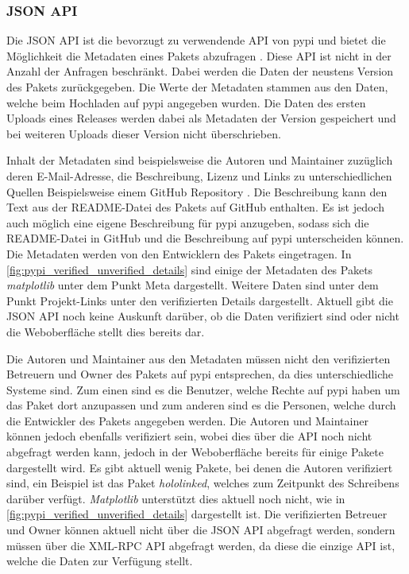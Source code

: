 \subsubsection*{JSON API}
\label{subsubsec:pypi_json_api}
Die JSON API ist die bevorzugt zu verwendende API von \gls{pypi} und bietet die Möglichkeit die Metadaten eines Pakets abzufragen \autocite{python_software_foundation_warehouse_2024}.
Diese API ist nicht in der Anzahl der Anfragen beschränkt.
Dabei werden die Daten der neustens Version des Pakets zurückgegeben.
Die Werte der Metadaten stammen aus den Daten, welche beim Hochladen auf \gls{pypi} angegeben wurden.
Die Daten des ersten Uploads eines Releases werden dabei als Metadaten der Version gespeichert und bei weiteren Uploads dieser Version nicht überschrieben.

Inhalt der Metadaten sind beispielsweise die Autoren und Maintainer zuzüglich deren E-Mail-Adresse, die Beschreibung, Lizenz und Links zu unterschiedlichen Quellen Beispielsweise einem GitHub Repository \autocite{python_software_foundation_warehouse_2024}.
Die Beschreibung kann den Text aus der README-Datei des Pakets auf GitHub enthalten.
Es ist jedoch auch möglich eine eigene Beschreibung für \gls{pypi} anzugeben, sodass sich die README-Datei in GitHub und die Beschreibung auf \gls{pypi} unterscheiden können.
Die Metadaten werden von den Entwicklern des Pakets eingetragen.
In \autoref{fig:pypi_verified_unverified_details} sind einige der Metadaten des Pakets \emph{matplotlib} unter dem Punkt \glqq Meta\grqq{} dargestellt.
Weitere Daten sind unter dem Punkt \glqq Projekt-Links\grqq{} unter den verifizierten Details dargestellt.
Aktuell gibt die JSON API noch keine Auskunft darüber, ob die Daten verifiziert sind oder nicht die Weboberfläche stellt dies bereits dar.

Die Autoren und Maintainer aus den Metadaten müssen nicht den verifizierten Betreuern und Owner des Pakets auf \gls{pypi} entsprechen, da dies unterschiedliche Systeme sind.
Zum einen sind es die Benutzer, welche Rechte auf \gls{pypi} haben um das Paket dort anzupassen und zum anderen sind es die Personen, welche durch die Entwickler des Pakets angegeben werden.
Die Autoren und Maintainer können jedoch ebenfalls verifiziert sein, wobei dies über die API noch nicht abgefragt werden kann, jedoch in der Weboberfläche bereits für einige Pakete dargestellt wird.
Es gibt aktuell wenig Pakete, bei denen die Autoren verifiziert sind, ein Beispiel ist das Paket \emph{hololinked}, welches zum Zeitpunkt des Schreibens darüber verfügt.
\emph{Matplotlib} unterstützt dies aktuell noch nicht, wie in \autoref{fig:pypi_verified_unverified_details} dargestellt ist.
Die verifizierten Betreuer und Owner können aktuell nicht über die JSON API abgefragt werden, sondern müssen über die XML-RPC API abgefragt werden, da diese die einzige API ist, welche die Daten zur Verfügung stellt.

